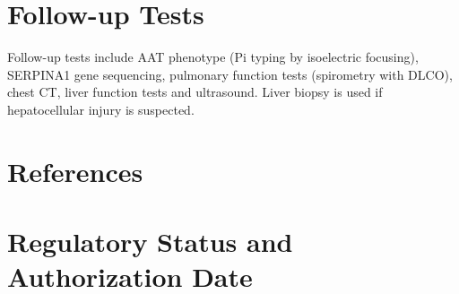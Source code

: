 \section*{Follow-up Tests}
Follow-up tests include AAT phenotype (Pi typing by isoelectric focusing), SERPINA1 gene sequencing, pulmonary function tests (spirometry with DLCO), chest CT, liver function tests and ultrasound. Liver biopsy is used if hepatocellular injury is suspected.
\section*{References}



\clearpage
\section*{Regulatory Status and Authorization Date}

\clearpage
